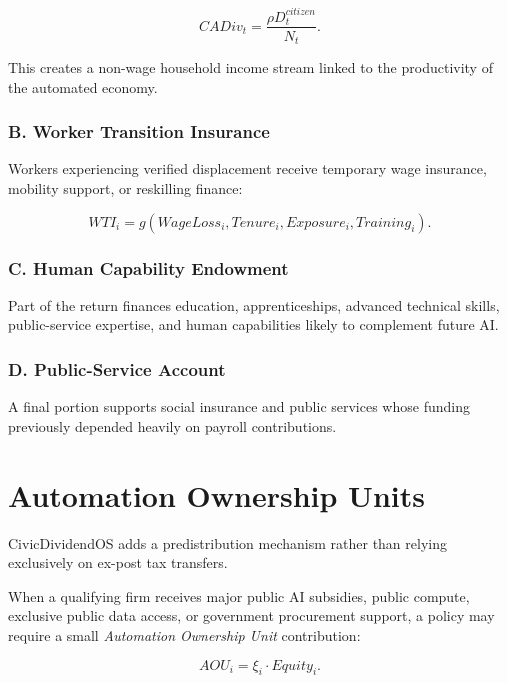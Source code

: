 \documentclass[conference]{IEEEtran}
\begin{document}
\begin{equation}
CADiv_t =
\frac{\rho D^{citizen}_t}{N_t}.
\end{equation}

This creates a non-wage household income stream linked to the productivity of
the automated economy.

\subsubsection{B. Worker Transition Insurance}

Workers experiencing verified displacement receive temporary wage insurance,
mobility support, or reskilling finance:

\begin{equation}
WTI_i =
g(WageLoss_i,Tenure_i,Exposure_i,Training_i).
\end{equation}

\subsubsection{C. Human Capability Endowment}

Part of the return finances education, apprenticeships, advanced technical
skills, public-service expertise, and human capabilities likely to complement
future AI.

\subsubsection{D. Public-Service Account}

A final portion supports social insurance and public services whose funding
previously depended heavily on payroll contributions.

\section{Automation Ownership Units}

CivicDividendOS adds a predistribution mechanism rather than relying exclusively
on ex-post tax transfers.

When a qualifying firm receives major public AI subsidies, public compute,
exclusive public data access, or government procurement support, a policy may
require a small \textit{Automation Ownership Unit} contribution:

\begin{equation}
AOU_i = \xi_i \cdot Equity_i.
\end{equation}
\end{document}
